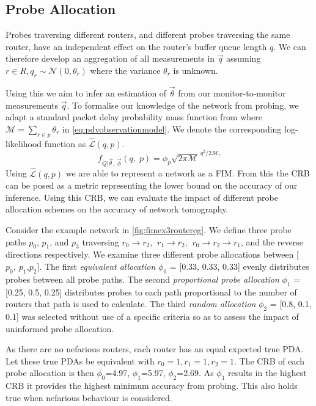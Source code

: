 \subsection{Probe Allocation}
\label{ssec:Mprobeallocation}
Probes traversing different routers, and different probes traversing the same router, have an independent effect on the router's buffer queue length $q$. We can therefore develop an aggregation of all measurements in $\vec{q}$ assuming $r\in R, q_r \sim \mathcal{N}(0, \theta_r)$ where the variance $\theta_r$ is unknown.\par
Using this we aim to infer an estimation of $\vec{\theta}$ from our monitor-to-monitor measurements $\vec{q}$. To formalise our knowledge of the network from probing, we adapt a standard packet delay probability mass function from \cite{he_network_2021} where $\mathcal{M} = \sum_{r\in p}\theta_r$ in \cref{eq:pdvobservationmodel}. We denote the corresponding log-likelihood function as $\widehat{\mathcal{L}}(q, p)$.
\begin{equation}
\label{eq:pdvobservationmodel}
    f_{Q|\vec{\theta},\; \vec{\phi}}(q,\;p) = \phi_p \sqrt{2\pi\mathcal{M}}^{\ q^2/{2\mathcal{M}_r}}
\end{equation}
Using $\widehat{\mathcal{L}}(q, p)$ we are able to represent a network as a FIM. From this the CRB can be posed as a metric representing the lower bound on the accuracy of our inference. Using this CRB, we can evaluate the impact of different probe allocation schemes on the accuracy of network tomography.\par
Consider the example network in \cref{fig:fimex3routereg}. We define three probe paths $p_0$, $p_1$, and $p_3$ traversing $r_0\rightarrow r_2$, $\ r_1\rightarrow r_2$, $\ r_0\rightarrow r_2\rightarrow r_1$, and the reverse directions respectively. We examine three different probe allocations between [$p_0,\:p_1$,\:$p_2$]. The first \textit{equivalent allocation} $\phi_0$ = [0.33, 0.33, 0.33] evenly distributes probes between all probe paths. The second \textit{proportional probe allocation} $\phi_1$ = [0.25, 0.5, 0.25] distributes probes to each path proportional to the number of routers that path is used to calculate. The third \textit{random allocation} $\phi_2$ = [0.8, 0.1, 0.1] was selected without use of a specific criteria so as to assess the impact of uninformed probe allocation.\par
As there are no nefarious routers, each router has an equal expected true PDA. Let these true PDAs be equivalent with $r_0=1, r_1=1, r_2=1$. The CRB of each probe allocation is then $\phi_0$=4.97, $\phi_1$=5.97, $\phi_2$=2.69. As $\phi_1$ results in the highest CRB it provides the highest minimum accuracy from probing. This also holds true when nefarious behaviour is considered.\par
